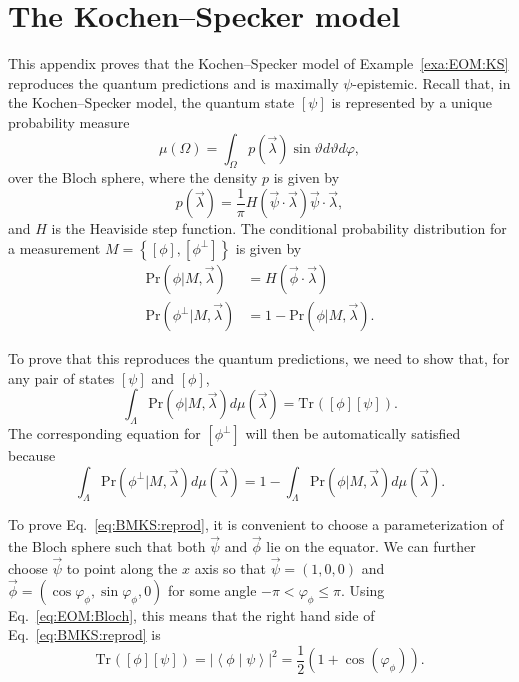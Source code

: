 \documentclass[DIV=calc,paper=a4,fontsize=11pt,twocolumn]{scrartcl} %
\theoremstyle{definition}
\theoremstyle{plain}
\newcommand{\BraKet}[2]{\ensuremath{\left \langle #1 \middle \vert #2
\right \rangle}}
\newcommand{\Proj}[1]{\ensuremath{\left [ #1 \right ]}}
\newcommand{\Tr}[2][]{\ensuremath{\text{Tr}_{#1} \left ( #2 \right )}}
\begin{document}
\section{The Kochen--Specker model}

\label{App:BMKS}

This appendix proves that the Kochen--Specker model of
Example~\ref{exa:EOM:KS} reproduces the quantum predictions and is
maximally $\psi$-epistemic.  Recall that, in the Kochen--Specker model,
the quantum state $\Proj{\psi}$ is represented by a unique probability
measure
\begin{equation}
\mu(\Omega) = \int_{\Omega} p(\vec{\lambda}) \sin \vartheta
d\vartheta d\varphi,
\end{equation}
over the Bloch sphere, where the density $p$ is given by
\begin{equation}
p(\vec{\lambda}) = \frac{1}{\pi} H \left ( \vec{\psi} \cdot
\vec{\lambda} \right ) \vec{\psi} \cdot \vec{\lambda},
\end{equation}
and $H$ is the Heaviside step function.  The conditional probability
distribution for a measurement $M = \left \{ \Proj{\phi},
\Proj{\phi^{\perp}} \right \}$ is given by
\begin{align}
\text{Pr}(\phi|M, \vec{\lambda}) & = H (\vec{\phi} \cdot
\vec{\lambda}) \\
\text{Pr}(\phi^{\perp}|M, \vec{\lambda}) & = 1 - \text{Pr}(\phi |M,
\vec{\lambda}).
\end{align}

To prove that this reproduces the quantum predictions, we need to show
that, for any pair of states $\Proj{\psi}$ and $\Proj{\phi}$,
\begin{equation}
\label{eq:BMKS:reprod}
\int_{\Lambda} \text{Pr}(\phi|M,\vec{\lambda}) d\mu(\vec{\lambda}) =
\Tr{\Proj{\phi}\Proj{\psi}}.
\end{equation}
The corresponding equation for $\Proj{\phi^{\perp}}$ will then be
automatically satisfied because
\begin{equation}
\int_{\Lambda} \text{Pr}(\phi^{\perp}|M,\vec{\lambda})
d\mu(\vec{\lambda}) = 1 -  \int_{\Lambda}
\text{Pr}(\phi|M,\vec{\lambda}) d\mu(\vec{\lambda}).
\end{equation}

To prove Eq.~\eqref{eq:BMKS:reprod}, it is convenient to choose a
parameterization of the Bloch sphere such that both $\vec{\psi}$ and
$\vec{\phi}$ lie on the equator.  We can further choose $\vec{\psi}$
to point along the $x$ axis so that $\vec{\psi} = (1,0,0)$ and
$\vec{\phi} = (\cos \varphi_{\phi}, \sin \varphi_{\phi}, 0)$ for some
angle $-\pi < \varphi_{\phi} \leq \pi$.  Using
Eq.~\eqref{eq:EOM:Bloch}, this means that the right hand side of
Eq.~\eqref{eq:BMKS:reprod} is
\begin{equation}
\Tr{\Proj{\phi}\Proj{\psi}} = \left | \BraKet{\phi}{\psi} \right
|^2 = \frac{1}{2}\left ( 1 + \cos(\varphi_{\phi}) \right ).
\end{equation}
\end{document}
